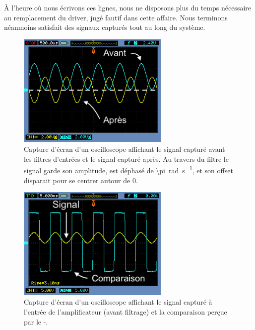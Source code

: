 \documentclass[10pt, oneside, a4paper]{article}
\begin{document}
À l'heure où nous écrivons ces lignes, nous ne disposons plus du temps nécessaire au remplacement du driver, jugé fautif dans cette affaire.
Nous terminons néanmoins satisfait des signaux capturés tout au long du système.


\pagebreak
\begin{figure}[p]
	\centering
	\includegraphics[width=0.65\textwidth]{image/osci-post-filters.png}
	\caption{Capture d'écran d'un oscilloscope affichant le signal capturé avant les
			 filtres d'entrées et le signal capturé après.
			 Au travers du filtre le signal garde son amplitude, est déphasé de
			 \SI{\pi}{\radian\per\second}, et son offset disparait pour se centrer autour
			 de 0.}
	\label{fig:osci-post-filters}
\end{figure}

\begin{figure}[p]
	\centering
	\includegraphics[width=0.65\textwidth]{image/osci-compar.png}
	\caption{Capture d'écran d'un oscilloscope affichant le signal capturé à l'entrée
			 de l'amplificateur (avant filtrage) et la comparaison perçue par le
			 \Sigma{}-\Delta{}.}
	\label{fig:osci-compar}
\end{figure}
\end{document}
